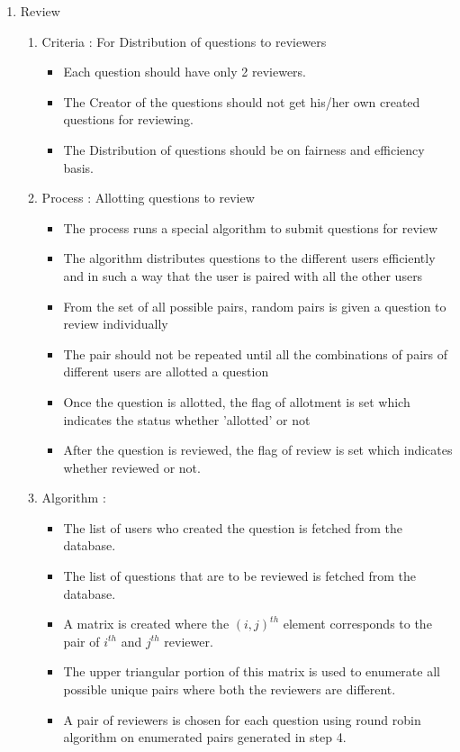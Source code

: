 \documentclass[a4paper,12pt,oneside]{book}
\begin{document}
\begin{enumerate}
        \item Review
            \begin{enumerate}
                \item Criteria : For Distribution of questions to reviewers
                \begin{itemize}
                    \item Each question should have only 2 reviewers.
                    \item  The Creator of the questions should not get his/her own created questions for reviewing.
                    \item  The Distribution of questions should be on fairness and efficiency basis.
                \end{itemize}
            \item Process : Allotting questions to review
                \begin{itemize}
                    \item  The process runs a special algorithm to submit questions for review 
                    \item  The algorithm distributes questions to the different users efficiently and in such a way that the user is paired with all the other users
                    \item  From the set of all possible pairs, random pairs is given a question to review individually
                    \item The pair should not be repeated until all the combinations of pairs of different users are allotted a question
                    \item Once the question is allotted, the flag of allotment is set which indicates the status whether 'allotted' or not
                    \item After the question is reviewed, the flag of review is set which indicates whether reviewed or not.
                \end{itemize}
            \item Algorithm :
                \begin{itemize}
                   \item The list of users who created the question is fetched from the database.
                	\item The list of questions that are to be reviewed is fetched from the database.
                	\item A matrix is created where the $(i, j)^{th}$ element corresponds to the pair of $i^{th}$ and $j^{th}$ reviewer.
                	\item The upper triangular portion of this matrix is used to enumerate all possible unique pairs where both the reviewers are different.
                	\item A pair of reviewers is chosen for each question using round robin algorithm on enumerated pairs generated in step 4.
	

\end{itemize}
\end{enumerate}
\end{enumerate}
\end{document}
